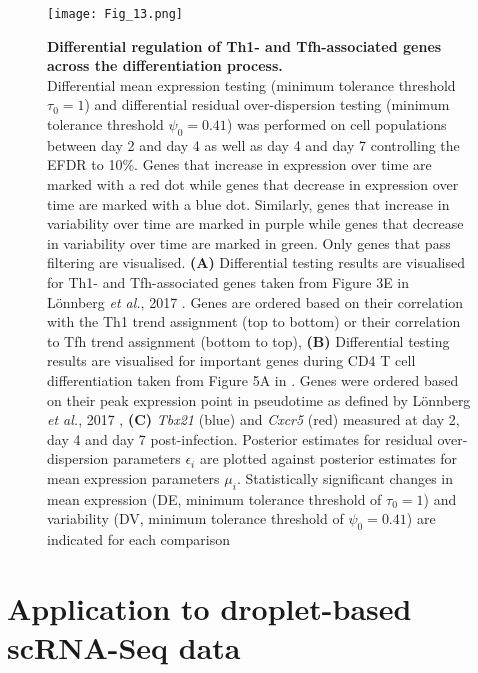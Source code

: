 \newpage

\begin{figure}[!h]
  \begin{minipage}[c]{0.57\textwidth}
    \texttt{[image: Fig\_13.png]}
  \end{minipage}\hfill
  \begin{minipage}[c]{0.4\textwidth}
\caption[Differential regulation of lineage-associated genes across differentiation]{\textbf{Differential regulation of Th1- and Tfh-associated genes across the differentiation process.}\\
Differential mean expression testing (minimum tolerance threshold $\tau_0=1$) and differential residual over-dispersion testing (minimum tolerance threshold $\psi_0=0.41$) was performed on cell populations between day 2 and day 4 as well as day 4 and day 7 controlling the EFDR to 10\%. Genes that increase in expression over time are marked with a red dot while genes that decrease in expression over time are marked with a blue dot. Similarly, genes that increase in variability over time are marked in purple while genes that decrease in variability over time are marked in green. Only genes that pass filtering are visualised. \textbf{(A)} Differential testing results are visualised for Th1- and Tfh-associated genes taken from Figure 3E in L\"onnberg \emph{et al.}, 2017 \citep{Lonnberg2017}. Genes are ordered based on their correlation with the Th1 trend assignment (top to bottom) or their correlation to Tfh trend assignment (bottom to top), \textbf{(B)} Differential testing results are visualised for important genes during CD4\plus{} T cell differentiation taken from Figure 5A in \citep{Lonnberg2017}. Genes were ordered based on their peak expression point in pseudotime as defined by L\"onnberg \emph{et al.}, 2017 \citep{Lonnberg2017}, \textbf{(C)} \textit{Tbx21} (blue) and \textit{Cxcr5} (red) measured at day 2, day 4 and day 7 post-infection. Posterior estimates for residual over-dispersion parameters $\epsilon_i$ are plotted against posterior estimates for mean expression parameters $\mu_i$. Statistically significant changes in mean expression (DE, minimum tolerance threshold of $\tau_0=1$) and variability (DV, minimum tolerance threshold of $\psi_0=0.41$) are indicated for each comparison} \label{fig2:immune_differentiation2}
  \end{minipage}
\end{figure}

\newpage

\section{Application to droplet-based scRNA-Seq data}
\label{sec2:droplet}

